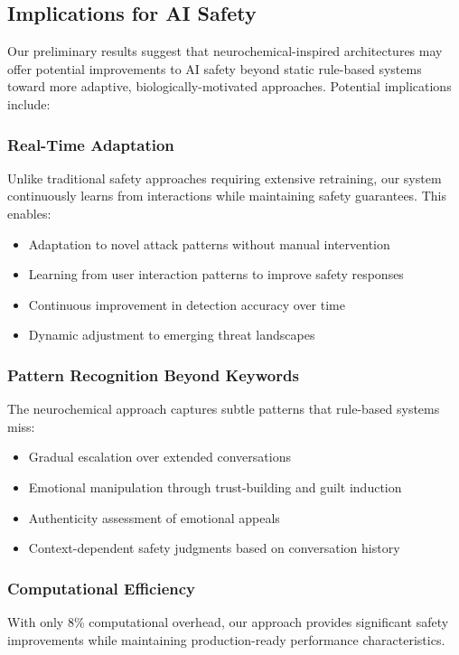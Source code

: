 \documentclass[12pt]{article}
\begin{document}
\subsection{Implications for AI Safety}

Our preliminary results suggest that neurochemical-inspired architectures may offer potential improvements to AI safety beyond static rule-based systems toward more adaptive, biologically-motivated approaches. Potential implications include:

\subsubsection{Real-Time Adaptation}
Unlike traditional safety approaches requiring extensive retraining, our system continuously learns from interactions while maintaining safety guarantees. This enables:
\begin{itemize}
\item Adaptation to novel attack patterns without manual intervention
\item Learning from user interaction patterns to improve safety responses
\item Continuous improvement in detection accuracy over time
\item Dynamic adjustment to emerging threat landscapes
\end{itemize}

\subsubsection{Pattern Recognition Beyond Keywords}
The neurochemical approach captures subtle patterns that rule-based systems miss:
\begin{itemize}
\item Gradual escalation over extended conversations
\item Emotional manipulation through trust-building and guilt induction
\item Authenticity assessment of emotional appeals
\item Context-dependent safety judgments based on conversation history
\end{itemize}

\subsubsection{Computational Efficiency}
With only 8\% computational overhead, our approach provides significant safety improvements while maintaining production-ready performance characteristics.
\end{document}
